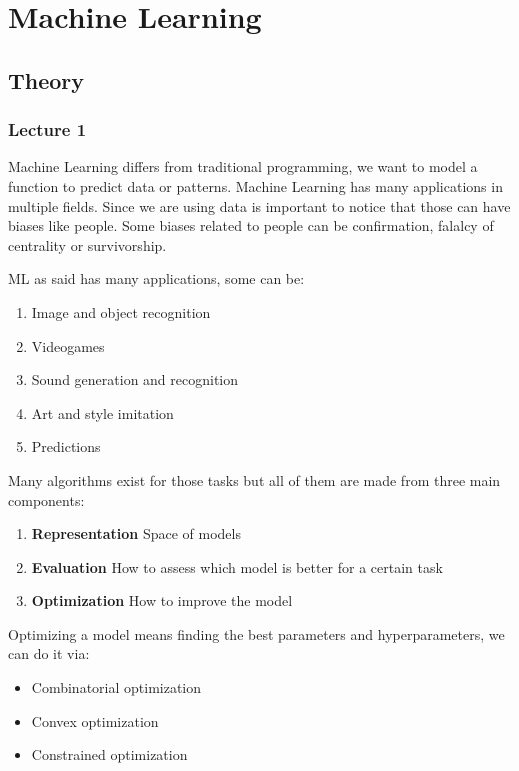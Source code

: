 \section{Machine Learning}
\subsection{Theory}

\subsubsection{Lecture 1}

Machine Learning differs from traditional programming, we want to model a function to predict data or patterns. Machine Learning has many applications in multiple fields. Since we are using data is important to notice that those can have biases like people. Some biases related to people can be confirmation, falalcy of centrality or survivorship.

\vspace{10pt}

ML as said has many applications, some can be:
\begin{enumerate}
    \item Image and object recognition
    \item Videogames
    \item Sound generation and recognition
    \item Art and style imitation
    \item Predictions
\end{enumerate}

\vspace{10pt}

Many algorithms exist for those tasks but all of them are made from three main components:
\begin{enumerate}
    \item \textbf{Representation} \ra Space of models
    \item \textbf{Evaluation} \ra How to assess which model is better for a certain task
    \item \textbf{Optimization} \ra How to improve the model
\end{enumerate}

Optimizing a model means finding the best parameters and hyperparameters, we can do it via:
\begin{itemize}
    \item Combinatorial optimization
    \item Convex optimization
    \item Constrained optimization
\end{itemize}

